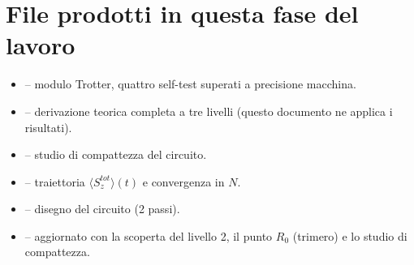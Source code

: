 \documentclass[11pt,a4paper]{article}
\begin{document}
\appendix
\section{File prodotti in questa fase del lavoro}

\begin{itemize}
\item \texttt{} -- modulo Trotter, quattro self-test superati a precisione macchina.
\item \texttt{} -- derivazione teorica completa a tre livelli (questo documento ne applica i risultati).
\item \texttt{} -- studio di compattezza del circuito.
\item \texttt{} -- traiettoria $\langle S_z^{tot}\rangle(t)$ e convergenza in $N$.
\item \texttt{} -- disegno del circuito (2 passi).
\item \texttt{} -- aggiornato con la scoperta del livello 2, il punto $R_0$ (trimero) e lo studio di compattezza.
\end{itemize}
\end{document}
